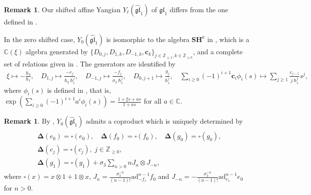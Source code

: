 \documentclass[10pt]{amsart}
\theoremstyle{definition}
\newtheorem{Remark}[Theorem]{Remark}
\numberwithin{equation}{section}
\newcommand{\bC}{\mathbb{C}}
\newcommand{\bZ}{\mathbb{Z}}
\begin{document}

\begin{Remark}
Our shifted affine Yangian $Y_\ell(\widehat{\mathfrak{gl}}_1)$ of $\mathfrak{gl}_1$ differs from the one defined in \cite[\S 4.1]{RSYZ}.

In the zero shifted case, $Y_0(\widehat{\mathfrak{gl}}_1)$ is isomorphic to the algebra $\mathbf{SH}^{\mathbf c}$ in \cite[\S 1.8]{SV1}, which is a $\mathbb C(\xi)$ algebra  generated by $\{D_{0,j},D_{1,k},D_{-1,k},\mathbf c_k\}_{j\in \mathbb Z_{\geqslant 1},k\in \mathbb Z_{\geqslant 0}}$, and a complete set of relations given in \cite{AS}. The generators are identified by
\begin{align}\label{iso Y(gl_1) SH}
\xi\mapsto -\frac{\hbar_3}{\hbar_1},\quad D_{1,j}\mapsto \frac{-e_j}{\hbar_3\:\hbar_1^j},\quad D_{-1,j}\mapsto \frac{-f_j}{\sigma_3\:\hbar_1^j},\quad D_{0,j+1}\mapsto \frac{g_j}{\hbar_1^j},\quad \sum_{i\geqslant 0}(-1)^{i+1}\mathbf c_i\phi_i(s)\mapsto \sum_{j\geqslant 1}\frac{c_{j-1}}{j\:\hbar_1^j}s^j,
\end{align}
where $\phi_i(s)$ is defined in \cite[(1.68)]{SV1}, that is, $\exp\left(\sum_{i\geqslant 0}(-1)^{i+1}a^i\phi_i(s)\right)=\frac{1+\xi s+as}{1+as}$ for all $a\in \bC$.
\end{Remark}


\begin{Remark}\label{rmk coproduct affine Y}
By \cite[Thm.\,7.9]{SV1}, $Y_0(\widehat{\mathfrak{gl}}_1)$ admits a coproduct which is uniquely determined by 
\begin{align}\label{eqn:coproduct affine Y}
\begin{split}
    &\mathbf{\Delta}(e_0) =\square(e_0) ,\quad \mathbf{\Delta}(f_0) =\square(f_0) ,\quad \mathbf{\Delta}(g_0) =\square(g_0) ,\\
    &\mathbf{\Delta}(c_j) =\square(c_j), \;j\in\bZ_{\geqslant 0}, \\
        & \mathbf{\Delta}(g_1) = \square(g_1)  +\sigma_3 \sum_{n>0} n J_n \otimes J_{-n},
\end{split}
\end{align}
where $\square(x)=x\otimes 1+1\otimes x$, $J_n=\frac{\sigma_3^{-n}}{(n-1)!} \text{ad}^{n-1} _{-f_1} f_0$ and $J_{-n}=-\frac{\sigma_3^{-n}}{(n-1)!} \text{ad}^{n-1} _{e_1} e_0$ for $n>0$. 
\end{Remark}
\end{document}
